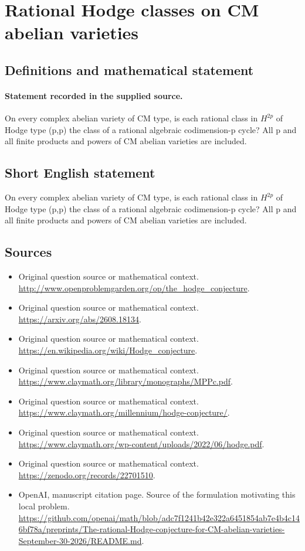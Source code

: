 \documentclass[11pt]{article}
\begin{document}
\section*{Rational Hodge classes on CM abelian varieties}\label{statement}
\subsection{Definitions and mathematical statement}
\paragraph{Statement recorded in the supplied source.}
On every complex abelian variety of CM type, is each rational class in $H^{2p}$ of Hodge type (p,p) the class of a rational algebraic codimension-p cycle? All p and all finite products and powers of CM abelian varieties are included.
\subsection{Short English statement}
On every complex abelian variety of CM type, is each rational class in $H^{2p}$ of Hodge type (p,p) the class of a rational algebraic codimension-p cycle? All p and all finite products and powers of CM abelian varieties are included.
\subsection{Sources}
\begin{itemize}
\item[S1] Original question source or mathematical context.
\url{http://www.openproblemgarden.org/op/the_hodge_conjecture}.
\item[S2] Original question source or mathematical context.
\url{https://arxiv.org/abs/2608.18134}.
\item[S3] Original question source or mathematical context.
\url{https://en.wikipedia.org/wiki/Hodge_conjecture}.
\item[S4] Original question source or mathematical context.
\url{https://www.claymath.org/library/monographs/MPPc.pdf}.
\item[S5] Original question source or mathematical context.
\url{https://www.claymath.org/millennium/hodge-conjecture/}.
\item[S6] Original question source or mathematical context.
\url{https://www.claymath.org/wp-content/uploads/2022/06/hodge.pdf}.
\item[S7] Original question source or mathematical context.
\url{https://zenodo.org/records/22701510}.
\item[S8] OpenAI, manuscript citation page. Source of the formulation motivating this local problem.
\url{https://github.com/openai/math/blob/adc7f1241b42e322a6451854ab7e4b4c146bf78a/preprints/The-rational-Hodge-conjecture-for-CM-abelian-varieties-September-30-2026/README.md}.
\end{itemize}
\end{document}
